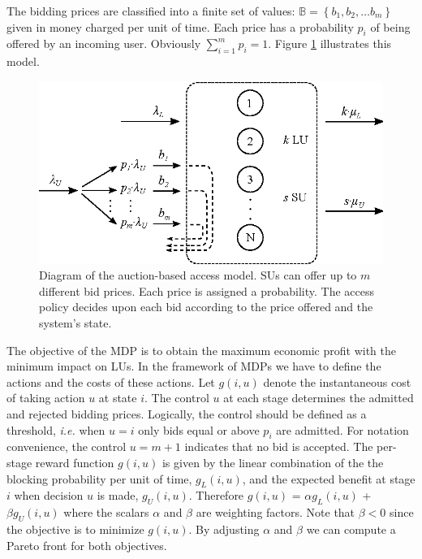 The bidding prices are classified into a finite set of values: $\mathbb{B}=\left\{b_{1},b_{2},\ldots b_{m}\right\}$ given in money charged per unit of time. Each price has a probability $p_{i}$ of being offered by an incoming user. Obviously $\sum^{m}_{i=1}p_{i}=1$. Figure \ref{fig:Diagram2} illustrates this model.

\begin{figure}[!t]
\centering
\includegraphics[scale=0.9]{diagram2.eps}
\caption[]{Diagram of the auction-based access model. SUs can offer up to $m$ different bid prices. Each  price is assigned a probability. The access policy decides upon each bid according to the price offered and the system's state.}
\label{fig:Diagram2}
\end{figure}

The objective of the MDP is to obtain the maximum economic profit with the minimum impact on LUs. In the framework of MDPs we have to define the actions and the costs of these actions.
 Let $g(i,u)$ denote the instantaneous cost of taking action $u$ at state $i$. The control $u$ at each stage determines the admitted and rejected bidding prices. Logically, the control should be defined as a threshold, \textit{i.e.} when $u = i$ only bids equal or above $p_{i}$ are admitted. For notation convenience, the control $u = m+1$ indicates that no bid is accepted. The per-stage reward function $g(i,u)$ is given by the linear combination of the the blocking probability per unit of time, $g_{L}(i,u)$, and the expected benefit at stage $i$ when decision $u$ is made, $g_{U}(i,u)$. Therefore $g(i,u)$ =  $\alpha g_{L}(i,u)$ + $\beta g_{U}(i,u)$ where the scalars $\alpha$ and $\beta$ are weighting factors. Note that $\beta < 0$ since the objective is to minimize $g(i,u)$. By adjusting $\alpha$ and $\beta$ we can compute a Pareto front for both objectives.

